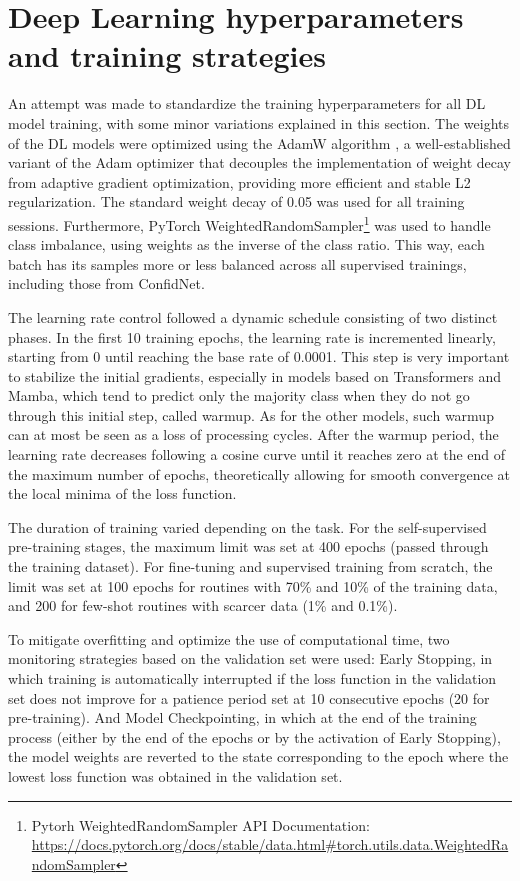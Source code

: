 \section{Deep Learning hyperparameters and training strategies}

An attempt was made to standardize the training hyperparameters for all \ac{DL} model training, with some minor variations explained in this section. The weights of the DL models were optimized using the AdamW algorithm \citep{loshchilov2019decoupledweightdecayregularization}, a well-established variant of the Adam \citep{kingma2017adammethodstochasticoptimization} optimizer that decouples the implementation of weight decay from adaptive gradient optimization, providing more efficient and stable L2 regularization. The standard weight decay of 0.05 was used for all training sessions. Furthermore, PyTorch WeightedRandomSampler\footnote{Pytorh WeightedRandomSampler API Documentation: \url{https://docs.pytorch.org/docs/stable/data.html\#torch.utils.data.WeightedRandomSampler}} was used to handle class imbalance, using weights as the inverse of the class ratio. This way, each batch has its samples more or less balanced across all supervised trainings, including those from ConfidNet.

The learning rate control followed a dynamic schedule consisting of two distinct phases. In the first 10 training epochs, the learning rate is incremented linearly, starting from 0 until reaching the base rate of 0.0001. This step is very important to stabilize the initial gradients, especially in models based on Transformers and Mamba, which tend to predict only the majority class when they do not go through this initial step, called warmup. As for the other models, such warmup can at most be seen as a loss of processing cycles. After the warmup period, the learning rate decreases following a cosine curve until it reaches zero at the end of the maximum number of epochs, theoretically allowing for smooth convergence at the local minima of the loss function.

The duration of training varied depending on the task. For the self-supervised pre-training stages, the maximum limit was set at 400 epochs (passed through the training dataset). For fine-tuning and supervised training from scratch, the limit was set at 100 epochs for routines with 70\% and 10\% of the training data, and 200 for few-shot routines with scarcer data (1\% and 0.1\%).

To mitigate overfitting and optimize the use of computational time, two monitoring strategies based on the validation set were used: Early Stopping, in which training is automatically interrupted if the loss function in the validation set does not improve for a patience period set at 10 consecutive epochs (20 for pre-training). And Model Checkpointing, in which at the end of the training process (either by the end of the epochs or by the activation of Early Stopping), the model weights are reverted to the state corresponding to the epoch where the lowest loss function was obtained in the validation set.

